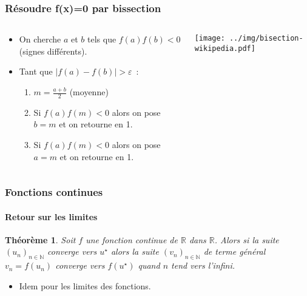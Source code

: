 \documentclass[10pt,notheorems]{beamer}
\theoremstyle{plain}
\newtheorem{theorem}{Théorème}
\theoremstyle{definition} %
\begin{document}
\begin{frame}
  \frametitle{Résoudre f(x)=0 par bissection}

  \begin{columns}[onlytextwidth]
    \begin{column}{.5\textwidth}
      \begin{itemize}

      \item On cherche $a$ et $b$ tels que $f(a)f(b)<0$ (signes différents).\newline

      \item Tant que $|f(a)-f(b)|>\varepsilon$~:\newline

        \begin{enumerate}
        \item $m = \frac{a+b}{2}$ (moyenne)
          \medskip
        \item Si $f(a)f(m)<0$ alors on pose $b = m$ et on retourne en 1.
          \medskip
        \item Si $f(a)f(m)<0$ alors on pose $a = m$ et on retourne en 1.
          \medskip
        \end{enumerate}

      \end{itemize}

    \end{column}
    \begin{column}{.5\textwidth}
      \begin{center}
        \texttt{[image: ../img/bisection-wikipedia.pdf]}
      \end{center}
    \end{column}
  \end{columns}

\end{frame}





\begin{frame}
  \frametitle{Fonctions continues}
  \framesubtitle{Retour sur les limites}

  \begin{theorem}
    Soit $f$ une fonction continue de $\mathbb R$ dans $\mathbb R$. Alors si la suite $(u_n)_{n\in\mathbb N}$ converge vers $u^{\star}$ alors la suite $(v_n)_{n\in\mathbb N}$ de terme général $v_n = f(u_n)$ converge vers $f(u^{\star})$ quand $n$ tend vers l'infini.
  \end{theorem}

  \bigskip

  \begin{itemize}

  \item Idem pour les limites des fonctions.

  \end{itemize}

\end{frame}
\end{document}
